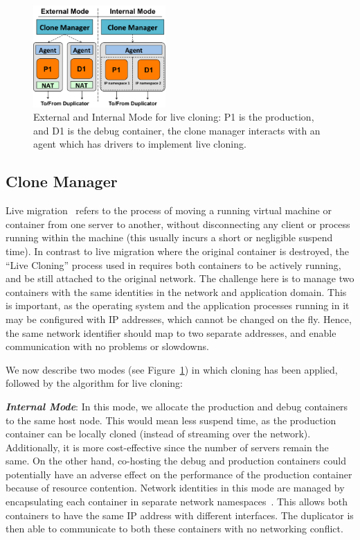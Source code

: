 
\begin{figure}[ht]
	\begin{center}
		\includegraphics[width=0.45\textwidth]{figs/ModesCloning.pdf}
		\caption{External and Internal Mode for live cloning: P1 is the production, and D1 is the debug container, the clone manager interacts with an agent which has drivers to implement live cloning.}
		\label{fig:modesCloning}
	\end{center}
\end{figure}


\subsection{Clone Manager} 
\label{sec:CloneManager}

Live migration~\cite{mirkin2008containers,clark2005live, gebhart2009dynamic} refers to the process of moving a running virtual machine or container from one server to another, without disconnecting any client or process running within the machine (this usually incurs a short or negligible suspend time). 
In contrast to live migration where the original container is destroyed, the ``Live Cloning'' process used in \parikshan requires both containers to be actively running, and be still attached to the original network.
The challenge here is to manage two containers with the same identities in the network and application domain. 
This is important, as the operating system and the application processes running in it may be configured with IP addresses, which cannot be changed on the fly.
Hence, the same network identifier should map to two separate addresses, and enable communication with no problems or slowdowns.

\noindent
We now describe two modes (see Figure~\ref{fig:modesCloning}) in which cloning has been applied, followed by the algorithm for live cloning:

\noindent
\textbf{\textit{Internal Mode}}: In this mode, we allocate the production and debug containers to the same host node. 
This would mean less suspend time, as the production container can be locally cloned (instead of streaming over the network). 
Additionally, it is more cost-effective since the number of servers remain the same.
On the other hand, co-hosting the debug and production containers could potentially have an adverse effect on the performance of the production container because of resource contention.
Network identities in this mode are managed by encapsulating each container in separate network namespaces~\cite{netns}.
This allows both containers to have the same IP address with different interfaces.
The duplicator is then able to communicate to both these containers with no networking conflict.

